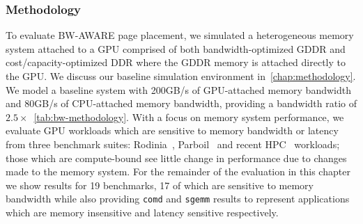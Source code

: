\subsubsection{Methodology\\}
To evaluate BW-AWARE page placement, we simulated a heterogeneous memory system
attached to a GPU comprised of both bandwidth-optimized GDDR and
cost/capacity-optimized DDR where the GDDR memory is attached directly to the
GPU\@.  We discuss our baseline simulation environment in~\ref{chap:methodology}.
We model a baseline system with 200GB/s of GPU-attached
memory bandwidth and 80GB/s of CPU-attached memory
bandwidth, providing a bandwidth ratio of $2.5\times$\@~\ref{tab:bw-methodology}.
With a focus on memory system performance, we evaluate GPU workloads which are
sensitive to memory bandwidth or latency from three benchmark suites:
Rodinia~\cite{Che2009}, Parboil~\cite{Parboil} and recent
HPC~\cite{comd,cns,minife,xsbench} workloads; those which are compute-bound see
little change in performance due to changes made to the memory system.  For the
remainder of the evaluation in this chapter we show results for 19 benchmarks,
17 of which are sensitive to memory bandwidth while also providing {\tt comd}
and {\tt sgemm} results to represent applications which are memory insensitive
and latency sensitive respectively.


